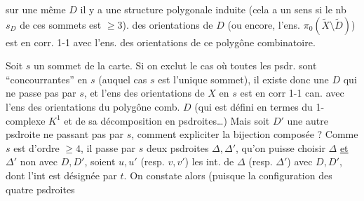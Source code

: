 sur une même $D$ il y a une structure
polygonale induite (cela a un sens  si
le nb $s_D$ de ces sommets est $\geq3$).  des
orientations de $D$ (ou encore, l'ens. $\pi_0(\widetilde X\setminus\widetilde D)$)
est en corr. 1-1 avec l'ens. des orientations
 de ce polygône combinatoire. 

Soit $s$ un sommet de la carte. Si on exclut le
cas où toutes les psdr. sont ``concourrantes'' en $s$
(auquel cas $s$ est l'unique sommet), il
existe donc une $D$ qui ne passe pas par $s$,
et l'ens  des orientations de $X$ en $s$ est en
corr 1-1 can. avec l'ens  des orientations
du polygône comb. $D$ (qui est défini en
termes du 1-complexe $K^1$ et de sa décomposition en psdroites\ldots) Mais soit $D'$ 
une autre psdroite ne passant pas par $s$, comment
expliciter la bijection composée
?  Comme $s$ est d'ordre $\geq4$,
il passe par $s$ deux psdroites $\Delta,\Delta'$,  
qu'on puisse  choisir $\Delta$ \uline{et} $\Delta'$ non  avec $D,D'$, soient
$u,u'$ (resp. $v,v'$) les int. de $\Delta$ (resp. $\Delta'$) avec $D,D'$,
dont l'int est désignée par $t$. On constate alors
(puisque la configuration des quatre psdroites
